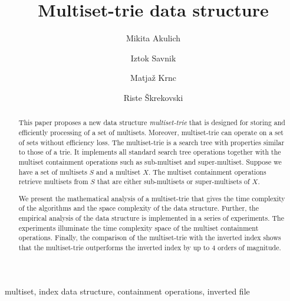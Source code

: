 \documentclass[preprint]{elsarticle}
\begin{document}
\begin{frontmatter}
\title{Multiset-trie data structure}
%
%

\author[FAMNIT]{Mikita Akulich}

\author[FAMNIT,FIS]{Iztok Savnik}

\author[FAMNIT]{Matja\v z Krnc} 

\author[FMF,FIS]{Riste \v Skrekovski}

%
%
%
\address[FAMNIT]{Faculty of mathematics, natural sciences and information technologies, University of Primorska, Slovenia}

\address[FMF]{Department of Mathematics, University of Ljubljana, Slovenia}

\address[FIS]{Faculty of Information Studies, Novo Mesto, Slovenia} 




\begin{abstract}
This paper proposes a new data structure \emph{multiset-trie} that is designed for storing and efficiently processing of a set of multisets. Moreover, multiset-trie can operate on a set of sets without efficiency loss.
%
The multiset-trie is a search tree with properties similar to those of a trie. It implements all standard search tree operations together with the multiset containment operations such as sub-multiset and super-multiset. Suppose we have a set of multisets $S$ and a multiset $X$. The multiset containment operations retrieve multisets from $S$ that are either sub-multisets or super-multisets of $X$. 

We present the mathematical analysis of a multiset-trie that gives the time complexity of the algorithms and the space complexity of the data structure. Further, the empirical analysis of the data structure is implemented in a series of experiments. The experiments illuminate the time complexity space of the multiset containment operations. Finally, the comparison of the multiset-trie with the inverted index shows that the multiset-trie outperforms the inverted index by up to 4 orders of magnitude.
\end{abstract}
% 
\begin{keyword}
multiset, index data structure, containment operations, inverted file
\end{keyword}

\end{frontmatter}
\end{document}
